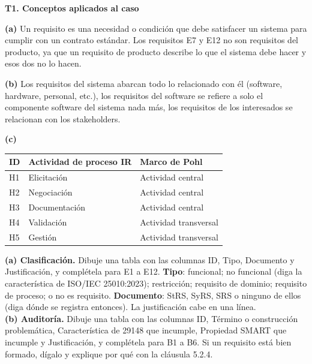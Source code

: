 \documentclass[11pt]{article}
\begin{document}
\begin{cajarespuesta}[title={Respuesta del estudiante: T1}]
	\textbf{T1. Conceptos aplicados al caso}

	\textbf{(a)} Un requisito es una necesidad o condición que debe satisfacer un sistema para cumplir con un contrato estándar. Los requisitos E7 y E12 no son requisitos del producto, ya que un requisito de producto describe lo que el sistema debe hacer y esos dos no lo hacen.

	\textbf{(b)} Los requisitos del sistema abarcan todo lo relacionado con él (software, hardware, personal, etc.), los requisitos del software se refiere a solo el componente software del sistema nada más, los requisitos de los interesados se relacionan con los stakeholders.

	\textbf{(c)}

	\medskip
	\begin{tabular}{|l|l|l|}
	\hline
	ID & Actividad de proceso IR & Marco de Pohl \\
	\hline
	H1 & Elicitación & Actividad central \\
	\hline
	H2 & Negociación & Actividad central \\
	\hline
	H3 & Documentación & Actividad central \\
	\hline
	H4 & Validación & Actividad transversal \\
	\hline
	H5 & Gestión & Actividad transversal \\
	\hline
	\end{tabular}
\end{cajarespuesta}


\begin{cajatarea}[title={T2. Clasificación y auditoría \hfill D2 · 30\,\%}]
	\textbf{(a) Clasificación.} Dibuje una tabla con las columnas ID, Tipo, Documento y Justificación, y complétela para E1 a E12. \textbf{Tipo}: funcional; no funcional (diga la característica de ISO/IEC 25010:2023); restricción; requisito de dominio; requisito de proceso; o no es requisito. \textbf{Documento}: StRS, SyRS, SRS o ninguno de ellos (diga dónde se registra entonces). La justificación cabe en una línea.\\[4pt]
	\textbf{(b) Auditoría.} Dibuje una tabla con las columnas ID, Término o construcción problemática, Característica de 29148 que incumple, Propiedad SMART que incumple y Justificación, y complétela para B1 a B6. Si un requisito está bien formado, dígalo y explique por qué con la cláusula 5.2.4.
\end{cajatarea}
\end{document}
